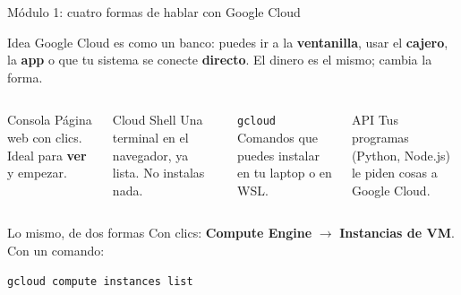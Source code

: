 \documentclass[aspectratio=169,10pt,c]{beamer}
\begin{document}
\begin{frame}[fragile]{Módulo 1: cuatro formas de hablar con Google Cloud}
\begin{block}{Idea}
\small Google Cloud es como un banco: puedes ir a la \textbf{ventanilla}, usar el \textbf{cajero}, la \textbf{app} o que tu sistema se conecte \textbf{directo}. El dinero es el mismo; cambia la forma.
\end{block}
\begin{columns}[T,onlytextwidth]
\begin{exampleblock}{Consola}
\footnotesize Página web con clics. Ideal para \textbf{ver} y empezar.
\end{exampleblock}
\begin{exampleblock}{Cloud Shell}
\footnotesize Una terminal en el navegador, ya lista. No instalas nada.
\end{exampleblock}
\begin{exampleblock}{\texttt{gcloud}}
\footnotesize Comandos que puedes instalar en tu laptop o en WSL.
\end{exampleblock}
\begin{exampleblock}{API}
\footnotesize Tus programas (Python, Node.js) le piden cosas a Google Cloud.
\end{exampleblock}
\end{columns}
\par\vspace{2mm}
\begin{block}{Lo mismo, de dos formas}
\small Con clics: \textbf{Compute Engine} $\rightarrow$ \textbf{Instancias de VM}. Con un comando:
\begin{lstlisting}[basicstyle=\ttfamily\footnotesize]
gcloud compute instances list
\end{lstlisting}
\end{block}
\end{frame}
\end{document}
